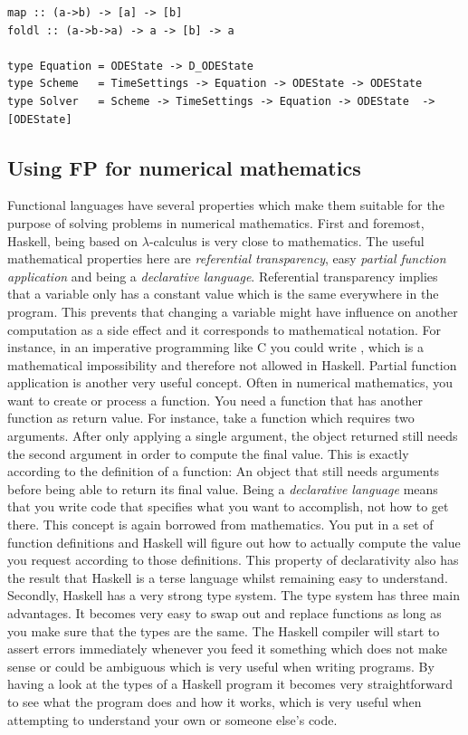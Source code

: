 \begin{lstlisting}[caption=Type signatures, label=lst:haskell_types]
map :: (a->b) -> [a] -> [b]
foldl :: (a->b->a) -> a -> [b] -> a

type Equation = ODEState -> D_ODEState
type Scheme   = TimeSettings -> Equation -> ODEState -> ODEState
type Solver   = Scheme -> TimeSettings -> Equation -> ODEState  -> [ODEState]
\end{lstlisting}

\subsection{Using FP for numerical mathematics}
Functional languages have several properties which make them suitable for the purpose of solving problems in numerical mathematics. First and foremost, Haskell, being based on $\lambda$-calculus is very close to mathematics. The useful mathematical properties here are \textit{referential transparency}, easy \textit{partial function application} and being a \textit{declarative language}. 
Referential transparency implies that a variable only has a constant value which is the same everywhere in the program. This prevents that changing a variable might have influence on another computation as a side effect and it corresponds to mathematical notation. For instance, in an imperative programming like C you could write , which is a mathematical impossibility and therefore not allowed in Haskell. 
Partial function application is another very useful concept. Often in numerical mathematics, you want to create or process a function. You need a function that has another function as return value. For instance, take a function which requires two arguments. After only applying a single argument, the object returned still needs the second argument in order to compute the final value. This is exactly according to the definition of a function: An object that still needs arguments before being able to return its final value.
Being a \textit{declarative language} means that you write code that specifies what you want to accomplish, not how to get there. This concept is again borrowed from mathematics. You put in a set of function definitions and Haskell will figure out how to actually compute the value you request according to those definitions. This property of declarativity also has the result that Haskell is a terse language whilst remaining easy to understand.
Secondly, Haskell has a very strong type system. The type system has three main advantages. It becomes very easy to swap out and replace functions as long as you make sure that the types are the same. The Haskell compiler will start to assert errors immediately whenever you feed it something which does not make sense or could be ambiguous which is very useful when writing programs. By having a look at the types of a Haskell program it becomes very straightforward to see what the program does and how it works, which is very useful when attempting to understand your own or someone else's code.
